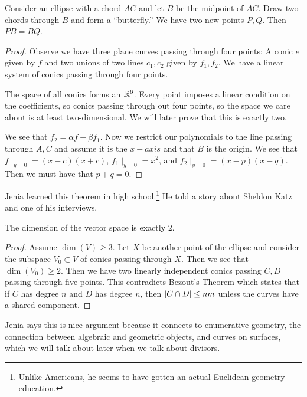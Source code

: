 \documentclass[twoside, 10pt]{article}
\begin{document}
    \begin{thm} Consider an ellipse with a chord $AC$ and
        let $B$ be the midpoint of $AC$. Draw two chords through $B$ and form a
        ``butterfly.'' We have two new points $P,Q$. Then $PB=BQ$.

        \begin{proof} Observe we have three plane curves passing through four
            points: A conic $e$ given by $f$ and two unions of two lines
            $c_1,c_2$ given by $f_1,f_2$. We have a linear system of conics
            passing through four points. 

            The space of all conics forms an $\mathbb{R}^6$. Every point imposes a
            linear condition on the coefficients, so conics passing through out
            four points, so the space we care about is at least
            two-dimensional. We will later prove that this is exactly two.

            We see that $f_2 = \alpha f + \beta f_1$. Now we restrict our
            polynomials to the line passing through $A,C$ and assume it is the
            $x-axis$ and that $B$ is the origin. We see that $f \mid_{y=0} =
            (x-c)(x+c)$, $f_1 \mid_{y=0} = x^2$, and $f_2 \mid_{y=0} =
        (x-p)(x-q)$. Then we must have that $p+q=0$.  \end{proof} \end{thm}

    Jenia learned this theorem in high school.\footnote{Unlike Americans, he
    seems to have gotten an actual Euclidean geometry education.} He told a
    story about Sheldon Katz and one of his interviews.

    \begin{lem} The dimension of the vector space is exactly $2$.

        \begin{proof} Assume $\dim(V) \geq 3$. Let $X$ be another point of the
            ellipse and consider the subspace $V_0 \subset V$ of conics passing
            through $X$. Then we see that $\dim(V_0) \geq 2$. Then we have two
            linearly independent conics passing $C,D$ passing through five
            points. This contradicts Bezout's Theorem which states that if $C$
        has degree $n$ and $D$ has degree $n$, then $\lvert C \cap D\rvert \leq nm$
    unless the curves have a shared component.  \end{proof} \end{lem}

    Jenia says this is nice argument because it connects to enumerative
    geometry, the connection between algebraic and geometric objects, and
    curves on surfaces, which we will talk about later when we talk about
    divisors.
\end{document}

